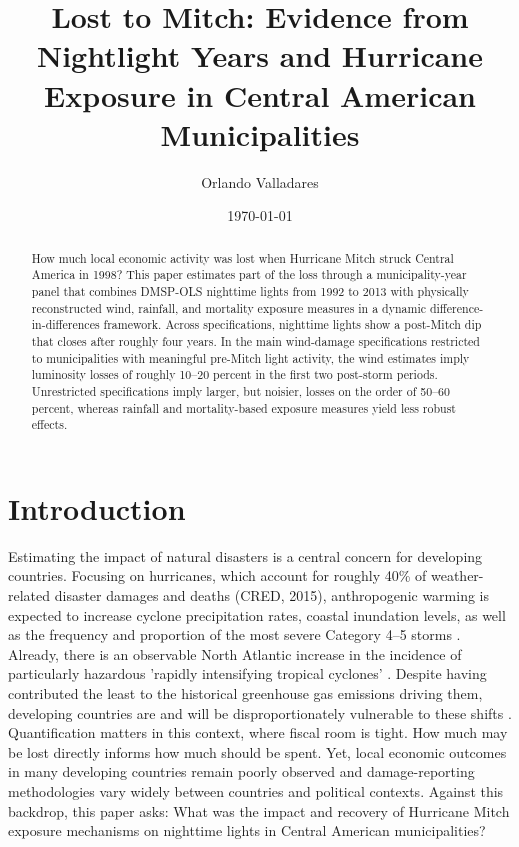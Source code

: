 \documentclass[12pt]{article}
\title{Lost to Mitch: Evidence from Nightlight Years and Hurricane Exposure in Central American Municipalities}
\author{Orlando Valladares}
\date{\today}
\begin{document}
\maketitle
\onehalfspacing

\begin{abstract}
\noindent How much local economic activity was lost when Hurricane Mitch struck Central America in 1998? This paper estimates part of the loss through a municipality-year panel that combines DMSP-OLS nighttime lights from 1992 to 2013 with physically reconstructed wind, rainfall, and mortality exposure measures in a dynamic difference-in-differences framework. Across specifications, nighttime lights show a post-Mitch dip that closes after roughly four years. In the main wind-damage specifications restricted to municipalities with meaningful pre-Mitch light activity, the wind estimates imply luminosity losses of roughly 10--20 percent in the first two post-storm periods. Unrestricted specifications imply larger, but noisier, losses on the order of 50--60 percent, whereas rainfall and mortality-based exposure measures yield less robust effects.

\end{abstract}

\section{Introduction}
Estimating the impact of natural disasters is a central concern for developing countries. Focusing on hurricanes, which account for roughly 40\% of weather-related disaster damages and deaths (CRED, 2015), anthropogenic warming is expected to increase cyclone precipitation rates, coastal inundation levels, as well as the frequency and proportion of the most severe Category 4--5 storms \parencite{knutson2020tropical}. Already, there is an observable North Atlantic increase in the incidence of particularly hazardous 'rapidly intensifying tropical cyclones' \parencite{garner2023observed}. Despite having contributed the least to the historical greenhouse gas emissions driving them, developing countries are and will be disproportionately vulnerable to these shifts \parencite{knutson2020tropical}. Quantification matters in this context, where fiscal room is tight. How much may be lost directly informs how much should be spent. Yet, local economic outcomes in many developing countries remain poorly observed and damage-reporting methodologies vary widely between countries and political contexts. Against this backdrop, this paper asks: What was the impact and recovery of Hurricane Mitch exposure mechanisms on nighttime lights in Central American municipalities?
\end{document}
